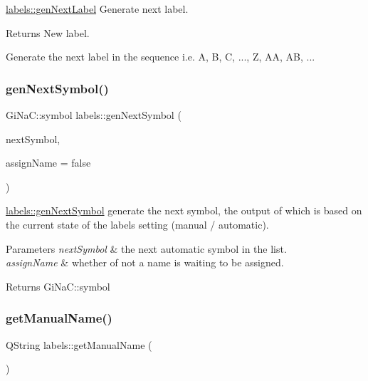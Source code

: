 \mbox{\hyperlink{classlabels_a70a7436dbef91e342fec4ec3130187e2}{labels\+::gen\+Next\+Label}} Generate next label. 

\begin{DoxyReturn}{Returns}
New label.
\end{DoxyReturn}
Generate the next label in the sequence i.\+e. A, B, C, ..., Z, AA, AB, ... \mbox{\label{classlabels_aac459cce2911a18cf66175a6ccfb87f3}} 
\subsubsection{\texorpdfstring{gen\+Next\+Symbol()}{genNextSymbol()}}
{\footnotesize\ttfamily Gi\+Na\+C\+::symbol labels\+::gen\+Next\+Symbol (\begin{DoxyParamCaption}\item[{Gi\+Na\+C\+::ex}]{next\+Symbol,  }\item[{bool}]{assign\+Name = {\ttfamily false} }\end{DoxyParamCaption})}



\mbox{\hyperlink{classlabels_aac459cce2911a18cf66175a6ccfb87f3}{labels\+::gen\+Next\+Symbol}} generate the next symbol, the output of which is based on the current state of the labels setting (manual / automatic). 


\begin{DoxyParams}{Parameters}
{\em next\+Symbol} & the next automatic symbol in the list. \\
\hline
{\em assign\+Name} & whether of not a name is waiting to be assigned. \\
\hline
\end{DoxyParams}
\begin{DoxyReturn}{Returns}
Gi\+Na\+C\+::symbol 
\end{DoxyReturn}
\mbox{\label{classlabels_a629e15f96a5f73b4bfdb9b18b9b98092}} 
\subsubsection{\texorpdfstring{get\+Manual\+Name()}{getManualName()}}
{\footnotesize\ttfamily Q\+String labels\+::get\+Manual\+Name (\begin{DoxyParamCaption}{ }\end{DoxyParamCaption})}



